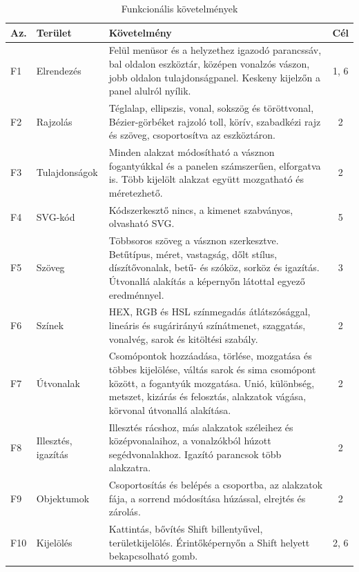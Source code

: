 \begin{table}[!htbp]
\caption{Funkcionális követelmények}
\label{tab:requirements}
\centering
\footnotesize
\renewcommand{\arraystretch}{1.2}
\begin{tabular}{|l|>{\raggedright\arraybackslash}p{}|>{\raggedright\arraybackslash}p{}|c|}
\hline
\textbf{Az.} & \textbf{Terület} & \textbf{Követelmény} & \textbf{Cél} \\ \hline
F1 & Elrendezés & Felül menüsor és a helyzethez igazodó parancssáv, bal oldalon eszköztár, középen vonalzós vászon, jobb oldalon tulajdonságpanel. Keskeny kijelzőn a panel alulról nyílik. & 1, 6 \\ \hline
F2 & Rajzolás & Téglalap, ellipszis, vonal, sokszög és töröttvonal, Bézier-görbéket rajzoló toll, körív, szabadkézi rajz és szöveg, csoportosítva az eszköztáron. & 2 \\ \hline
F3 & Tulajdonságok & Minden alakzat módosítható a vásznon fogantyúkkal és a panelen számszerűen, elforgatva is. Több kijelölt alakzat együtt mozgatható és méretezhető. & 2 \\ \hline
F4 & SVG-kód & Kódszerkesztő nincs, a kimenet szabványos, olvasható SVG. & 5 \\ \hline
F5 & Szöveg & Többsoros szöveg a vásznon szerkesztve. Betűtípus, méret, vastagság, dőlt stílus, díszítővonalak, betű- és szóköz, sorköz és igazítás. Útvonallá alakítás a képernyőn látottal egyező eredménnyel. & 3 \\ \hline
F6 & Színek & HEX, RGB és HSL színmegadás átlátszósággal, lineáris és sugárirányú színátmenet, szaggatás, vonalvég, sarok és kitöltési szabály. & 2 \\ \hline
F7 & Útvonalak & Csomópontok hozzáadása, törlése, mozgatása és többes kijelölése, váltás sarok és sima csomópont között, a fogantyúk mozgatása. Unió, különbség, metszet, kizárás és felosztás, alakzatok vágása, körvonal útvonallá alakítása. & 2 \\ \hline
F8 & Illesztés, igazítás & Illesztés rácshoz, más alakzatok széleihez és középvonalaihoz, a vonalzókból húzott segédvonalakhoz. Igazító parancsok több alakzatra. & 2 \\ \hline
F9 & Objektumok & Csoportosítás és belépés a csoportba, az alakzatok fája, a sorrend módosítása húzással, elrejtés és zárolás. & 2 \\ \hline
F10 & Kijelölés & Kattintás, bővítés Shift billentyűvel, területkijelölés. Érintőképernyőn a Shift helyett bekapcsolható gomb. & 2, 6 \\ \hline

\end{tabular}
\end{table}
